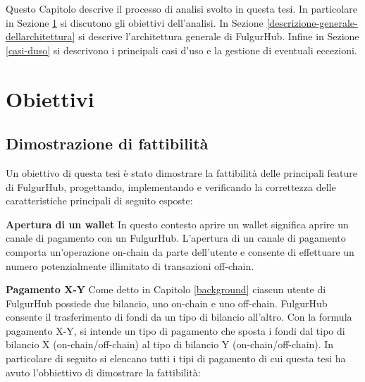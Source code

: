 \documentclass[12pt,italian,]{book}
\begin{document}
Questo Capitolo descrive il processo di analisi svolto in questa tesi. In particolare in Sezione \ref{obiettivi} si discutono gli obiettivi dell'analisi. In Sezione \ref{descrizione-generale-dellarchitettura} si descrive l'architettura generale di FulgurHub. Infine in Sezione \ref{casi-duso} si descrivono i principali casi d'uso e la gestione di eventuali eccezioni.

\hypertarget{obiettivi}{%
\section{Obiettivi}\label{obiettivi}}

\hypertarget{dimostrazione-di-fattibilituxe0}{%
\subsection{Dimostrazione di fattibilità}\label{dimostrazione-di-fattibilituxe0}}

Un obiettivo di questa tesi è stato dimostrare la fattibilità delle principali feature di FulgurHub, progettando, implementando e verificando la correttezza delle caratteristiche principali di seguito esposte:

\textbf{\textbf{Apertura di un wallet}} In questo contesto aprire un wallet significa aprire un canale di pagamento con un FulgurHub. L'apertura di un canale di pagamento comporta un'operazione on-chain da parte dell'utente e consente di effettuare un numero potenzialmente illimitato di transazioni off-chain.

\textbf{\textbf{Pagamento X-Y}} Come detto in Capitolo \ref{background} ciascun utente di FulgurHub possiede due bilancio, uno on-chain e uno off-chain. FulgurHub consente il trasferimento di fondi da un tipo di bilancio all'altro. Con la formula pagamento X-Y, si intende un tipo di pagamento che sposta i fondi dal tipo di bilancio X (on-chain/off-chain) al tipo di bilancio Y (on-chain/off-chain). In particolare di seguito si elencano tutti i tipi di pagamento di cui questa tesi ha avuto l'obbiettivo di dimostrare la fattibilità:
\end{document}
